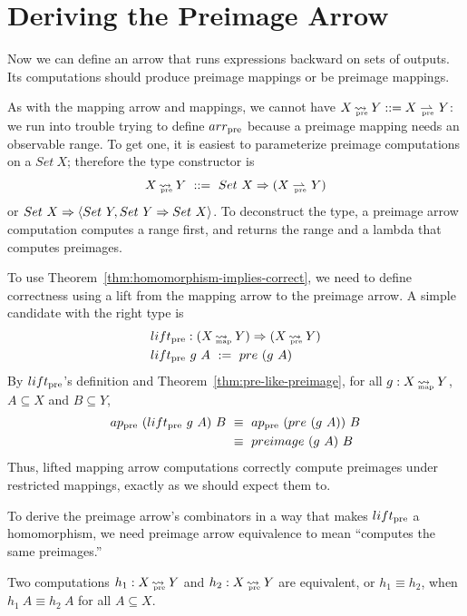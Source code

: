 \section{Deriving the Preimage Arrow}
\label{sec:preimage-arrow}

Now we can define an arrow that runs expressions backward on sets of outputs.
Its computations should produce preimage mappings or be preimage mappings.

As with the mapping arrow and mappings, we cannot have $X \preto Y ::= X \prepto Y$: we run into trouble trying to define $arr_\mathrm{pre}$ because a preimage mapping needs an observable range.
To get one, it is easiest to parameterize preimage computations on a $Set~X$; therefore the  type constructor is
\begin{equation}
	X \preto Y \ ::= \ Set~X \tto (X \prepto Y)
\end{equation}
or $Set~X \Rightarrow \langle{Set~Y, Set~Y \Rightarrow Set~X}\rangle$.
To deconstruct the type, a preimage arrow computation computes a range first, and returns the range and a lambda that computes preimages.

To use Theorem~\ref{thm:homomorphism-implies-correct}, we need to define correctness using a lift from the mapping arrow to the preimage arrow.
A simple candidate with the right type is
\begin{equation}
\begin{aligned}
	&\liftpre : (X \mapto Y) \tto (X \preto Y) \\
	&\liftpre~g~A \ := \ pre~(g~A)
\end{aligned}
\end{equation}
By $lift_\mathrm{pre}$'s definition and Theorem~\ref{thm:pre-like-preimage}, for all $g : X \operatorname{\rightsquigarrow_{\mspace{-21mu}_\mathrm{map}}} Y$, $A \subseteq X$ and $B \subseteq Y$,
\begin{equation}
\begin{aligned}
	ap_\mathrm{pre}~(lift_\mathrm{pre}~g~A)~B
		&\ \equiv \ ap_\mathrm{pre}~(pre~(g~A))~B
\\
		&\ \equiv \ preimage~(g~A)~B
\end{aligned}
\end{equation}
Thus, lifted mapping arrow computations correctly compute preimages under restricted mappings, exactly as we should expect them to.

To derive the preimage arrow's combinators in a way that makes $lift_\mathrm{pre}$ a homomorphism, we need preimage arrow equivalence to mean ``computes the same preimages.''

\begin{definition}
Two computations $h_1 : X \operatorname{\rightsquigarrow_{\mspace{-19mu}_\mathrm{pre}}} Y$ and $h_2 : X \operatorname{\rightsquigarrow_{\mspace{-19mu}_\mathrm{pre}}} Y$ are equivalent, or $h_1 \equiv h_2$, when 
$h_1~A \equiv h_2~A$ for all $A \subseteq X$.
\end{definition}

